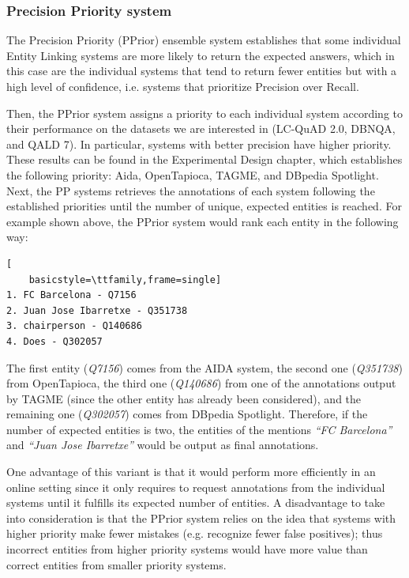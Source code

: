 \subsubsection{Precision Priority system}
\label{cap3:system/entLinModule/ensembleSystems/pprior}
The Precision Priority (PPrior) ensemble system establishes that some individual Entity 
Linking systems are more likely to return the expected answers, which in this case are the 
individual systems that tend to return fewer entities but with a high level of confidence, 
i.e. systems that prioritize Precision over Recall.

Then, the PPrior system assigns a priority to each individual system according to their 
performance on the datasets we are interested in (LC-QuAD 2.0, DBNQA, and QALD 7). In 
particular, systems with better precision have higher priority. These results can be found in 
the Experimental Design chapter, which establishes the following priority: Aida, OpenTapioca, 
TAGME, and DBpedia Spotlight. Next, the PP systems retrieves the annotations of each system 
following the established priorities until the number of unique, expected entities is reached. 
For example shown above, the PPrior system would rank each entity in the following way:

\begin{lstlisting}[
    basicstyle=\ttfamily,frame=single]
1. FC Barcelona - Q7156
2. Juan Jose Ibarretxe - Q351738
3. chairperson - Q140686
4. Does - Q302057     
\end{lstlisting}

The first entity (\textit{Q7156}) comes from the AIDA system, the second one (\textit{Q351738}) 
from OpenTapioca, the third one (\textit{Q140686}) from one of the annotations output by 
TAGME (since the other entity has already been considered), and the remaining one (\textit{Q302057}) 
comes from DBpedia Spotlight. Therefore, if the number of expected entities is two, the 
entities of the mentions \textit{“FC Barcelona”} and \textit{“Juan Jose Ibarretxe”} would be 
output as final annotations.

One advantage of this variant is that it would perform more efficiently in an online setting 
since it only requires to request annotations from the individual systems until it fulfills 
its expected number of entities. A disadvantage to take into consideration is that the PPrior 
system relies on the idea that systems with higher priority make fewer mistakes (e.g. 
recognize fewer false positives); thus incorrect entities from higher priority systems would 
have more value than correct entities from smaller priority systems.

